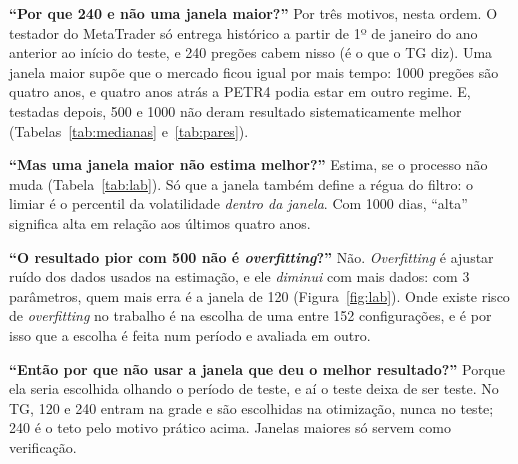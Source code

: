 \documentclass[11pt,a4paper]{article}
\begin{document}
\begin{banca}
\textbf{``Por que 240 e não uma janela maior?''} Por três motivos, nesta ordem. O testador do MetaTrader só entrega
histórico a partir de 1º de janeiro do ano anterior ao início do teste, e 240 pregões cabem nisso (é o que o TG
diz). Uma janela maior supõe que o mercado ficou igual por mais tempo: 1000 pregões são quatro anos, e quatro anos atrás a PETR4 podia
estar em outro regime. E, testadas depois, 500 e 1000 não deram resultado
sistematicamente melhor (Tabelas~\ref{tab:medianas} e~\ref{tab:pares}).

\textbf{``Mas uma janela maior não estima melhor?''} Estima, se o processo não muda (Tabela~\ref{tab:lab}). Só que a
janela também define a régua do filtro: o limiar é o percentil da volatilidade \emph{dentro da janela}. Com 1000
dias, ``alta'' significa alta em relação aos últimos quatro anos.

\textbf{``O resultado pior com 500 não é \emph{overfitting}?''} Não. \emph{Overfitting} é ajustar ruído dos dados
usados na estimação, e ele \emph{diminui} com mais dados: com 3 parâmetros, quem mais erra é a janela de 120
(Figura~\ref{fig:lab}). Onde existe risco de \emph{overfitting} no trabalho é na escolha de uma entre 152
configurações, e é por isso que a escolha é feita num período e avaliada em outro.

\textbf{``Então por que não usar a janela que deu o melhor resultado?''} Porque ela seria escolhida olhando o
período de teste, e aí o teste deixa de ser teste. No TG, 120 e 240 entram na grade e são escolhidas na otimização,
nunca no teste; 240 é o teto pelo motivo prático acima. Janelas maiores só servem como verificação.
\end{banca}
\end{document}
